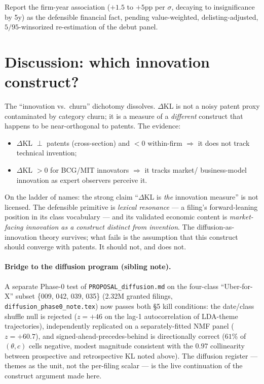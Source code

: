 \documentclass[11pt]{article}
\newcommand{\dkl}{$\Delta$KL}
\begin{document}
\noindent Report the firm-year association ($+1.5$ to $+5$pp per $\sigma$, decaying
to insignificance by 5y) as the defensible financial fact, pending value-weighted,
delisting-adjusted, $5/95$-winsorized re-estimation of the debut panel.

\section{Discussion: which innovation construct?}
The ``innovation vs.\ churn'' dichotomy dissolves. \dkl{} is not a noisy patent
proxy contaminated by category churn; it is a measure of a \emph{different}
construct that happens to be near-orthogonal to patents. The evidence:

\begin{itemize}[nosep]
\item \dkl{} $\perp$ patents (cross-section) and $<0$ within-firm $\Rightarrow$
it does not track technical invention;
\item \dkl{} $> 0$ for BCG/MIT innovators $\Rightarrow$ it tracks market/
business-model innovation as expert observers perceive it.
\end{itemize}

\noindent On the ladder of names: the strong claim ``\dkl{} is \emph{the}
innovation measure'' is not licensed. The defensible primitive is \emph{lexical
resonance} --- a filing's forward-leaning position in its class vocabulary --- and
its validated economic content is \emph{market-facing innovation as a construct
distinct from invention}. The diffusion-as-innovation theory survives; what fails
is the assumption that this construct should converge with patents. It should
not, and does not.

\paragraph{Bridge to the diffusion program (sibling note).} A separate
Phase-0 test of \texttt{PROPOSAL\_diffusion.md} on the four-class
``Uber-for-X'' subset \{009, 042, 039, 035\} (2.32M granted filings,
\texttt{diffusion\_phase0\_note.tex}) now passes both §5 kill conditions:
the date/class shuffle null is rejected ($z=+46$ on the lag-1 autocorrelation
of LDA-theme trajectories), independently replicated on a separately-fitted
NMF panel ($z=+60.7$), and signed-ahead-precedes-behind is directionally
correct ($61\%$ of $(\theta, c)$ cells negative, modest magnitude consistent
with the $0.97$ collinearity between prospective and retrospective KL noted
above). The diffusion register --- themes as the unit, not the per-filing
scalar --- is the live continuation of the construct argument made here.
\end{document}
